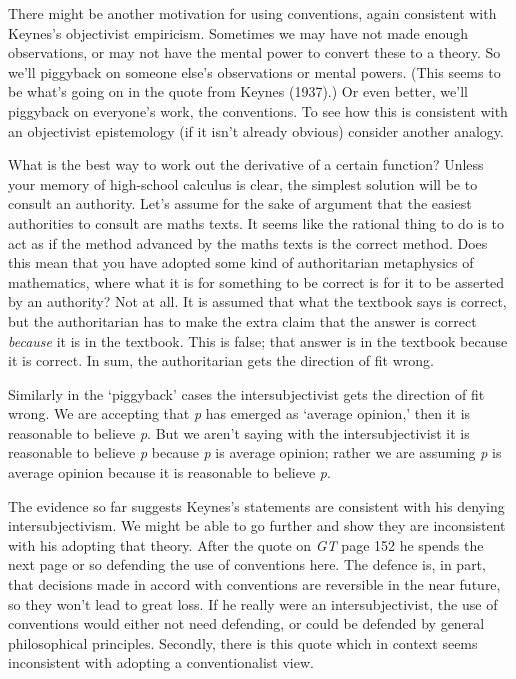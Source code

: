 \documentclass[noflushend]{philosophersimprint}
\begin{document}
There might be another motivation for using conventions, again
consistent with Keynes's objectivist empiricism. Sometimes we may have
not made enough observations, or may not have the mental power to
convert these to a theory. So we'll piggyback on someone else's
observations or mental powers. (This seems to be what's going on in the
quote from Keynes (1937).) Or even better, we'll piggyback on everyone's
work, the conventions. To see how this is consistent with an objectivist
epistemology (if it isn't already obvious) consider another analogy.

What is the best way to work out the derivative of a certain function?
Unless your memory of high-school calculus is clear, the simplest
solution will be to consult an authority. Let's assume for the sake of
argument that the easiest authorities to consult are maths texts. It
seems like the rational thing to do is to act as if the method advanced
by the maths texts is the correct method. Does this mean that you have
adopted some kind of authoritarian metaphysics of mathematics, where
what it is for something to be correct is for it to be asserted by an
authority? Not at all. It is assumed that what the textbook says is
correct, but the authoritarian has to make the extra claim that the
answer is correct \emph{because} it is in the textbook. This is false;
that answer is in the textbook because it is correct. In sum, the
authoritarian gets the direction of fit wrong.

Similarly in the `piggyback' cases the intersubjectivist gets the
direction of fit wrong. We are accepting that \emph{p} has emerged as
`average opinion,' then it is reasonable to believe \emph{p}. But we
aren't saying with the intersubjectivist it is reasonable to believe
\emph{p} because \emph{p} is average opinion; rather we are assuming
\emph{p} is average opinion because it is reasonable to believe
\emph{p}.

The evidence so far suggests Keynes's statements are consistent with his
denying intersubjectivism. We might be able to go further and show they
are inconsistent with his adopting that theory. After the quote on
\emph{GT} page 152 he spends the next page or so defending the use of
conventions here. The defence is, in part, that decisions made in accord
with conventions are reversible in the near future, so they won't lead
to great loss. If he really were an intersubjectivist, the use of
conventions would either not need defending, or could be defended by
general philosophical principles. Secondly, there is this quote which in
context seems inconsistent with adopting a conventionalist view.
\end{document}
